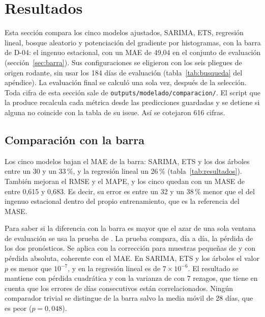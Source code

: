 \section{Resultados}\label{sec:resultados}

Esta sección compara los cinco modelos ajustados, SARIMA, ETS, regresión lineal, bosque aleatorio y potenciación del gradiente por histogramas, con la barra de D-04: el ingenuo estacional, con un MAE de 49,04 en el conjunto de evaluación (sección~\ref{sec:barra}). Sus configuraciones se eligieron con los seis pliegues de origen rodante, sin usar los 184 días de evaluación (tabla~\ref{tab:busqueda} del apéndice). La evaluación final se calculó una sola vez, después de la selección. Toda cifra de esta sección sale de \texttt{outputs/\allowbreak{}modelado/\allowbreak{}comparacion/}. El script que la produce recalcula cada métrica desde las predicciones guardadas y se detiene si alguna no coincide con la tabla de su issue. Así se cotejaron 616 cifras.

\subsection{Comparación con la barra}\label{sec:res-barra}

Los cinco modelos bajan el MAE de la barra: SARIMA, ETS y los dos árboles entre un 30 y un 33\,\%, y la regresión lineal un 26\,\% (tabla~\ref{tab:resultados}). También mejoran el RMSE y el MAPE, y los cinco quedan con un MASE de entre 0,615 y 0,683. Es decir, su error es entre un 32 y un 38\,\% menor que el del ingenuo estacional dentro del propio entrenamiento, que es la referencia del MASE.

Para saber si la diferencia con la barra es mayor que el azar de una sola ventana de evaluación se usa la prueba de \citet{diebold1995}. La prueba compara, día a día, la pérdida de los dos pronósticos. Se aplica con la corrección para muestras pequeñas de \citet{harvey1997} y con pérdida absoluta, coherente con el MAE. En SARIMA, ETS y los árboles el valor $p$ es menor que $10^{-7}$, y en la regresión lineal es de $7\times10^{-6}$. El resultado se mantiene con pérdida cuadrática y con la varianza de \citet{newey1987} con 7 rezagos, que tiene en cuenta que los errores de días consecutivos están correlacionados. Ningún comparador trivial se distingue de la barra salvo la media móvil de 28 días, que es peor ($p = 0{,}048$).

